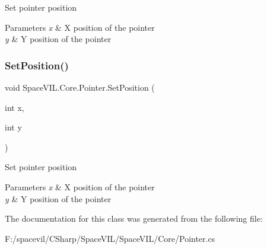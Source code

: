 Set pointer position 


\begin{DoxyParams}{Parameters}
{\em x} & X position of the pointer \\
\hline
{\em y} & Y position of the pointer \\
\hline
\end{DoxyParams}
\mbox{\label{class_space_v_i_l_1_1_core_1_1_pointer_a22add8b2868fcbf998e5b65b264e4761}} 
\subsubsection{\texorpdfstring{Set\+Position()}{SetPosition()}\hspace{0.1cm}{\footnotesize\ttfamily [2/2]}}
{\footnotesize\ttfamily void Space\+V\+I\+L.\+Core.\+Pointer.\+Set\+Position (\begin{DoxyParamCaption}\item[{int}]{x,  }\item[{int}]{y }\end{DoxyParamCaption})}



Set pointer position 


\begin{DoxyParams}{Parameters}
{\em x} & X position of the pointer \\
\hline
{\em y} & Y position of the pointer \\
\hline
\end{DoxyParams}


The documentation for this class was generated from the following file\+:\begin{DoxyCompactItemize}
\item 
F\+:/spacevil/\+C\+Sharp/\+Space\+V\+I\+L/\+Space\+V\+I\+L/\+Core/Pointer.\+cs\end{DoxyCompactItemize}

